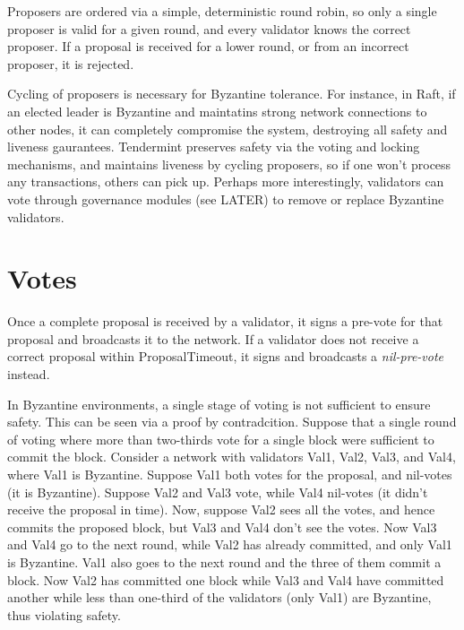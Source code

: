 Proposers are ordered via a simple, deterministic round robin, 
so only a single proposer is valid for a given round, 
and every validator knows the correct proposer. 
If a proposal is received for a lower round, or from an incorrect proposer, it is rejected.

Cycling of proposers is necessary for Byzantine tolerance. 
For instance, in Raft, if an elected leader is Byzantine and maintatins strong network connections to other nodes,
it can completely compromise the system, destroying all safety and liveness gaurantees.
Tendermint preserves safety via the voting and locking mechanisms, 
and maintains liveness by cycling proposers, so if one won't process any transactions, others can pick up.
Perhaps more interestingly, validators can vote through governance modules (see LATER) to remove or replace Byzantine validators.

\iffalse
TODO: move the tuning comment 
Upon entering a new round, validators wait ProposalTimeout to receive a complete proposal before broadcasting their pre-vote.
The ProposalTimeout thus serves as a critical paramter for tuning the performance of the system,
as it determines how much latency is permitted from proposers before validators start voting to skip them.
\fi

\section{Votes}

Once a complete proposal is received by a validator, 
it signs a pre-vote for that proposal and broadcasts it to the network.
If a validator does not receive a correct proposal within ProposalTimeout, 
it signs and broadcasts a \emph{nil-pre-vote} instead.

In Byzantine environments, a single stage of voting is not sufficient to ensure safety.
This can be seen via a proof by contradcition.
Suppose that a single round of voting where more than two-thirds vote for a single block were sufficient to commit the block.
Consider a network with validators Val1, Val2, Val3, and Val4, where Val1 is Byzantine.
Suppose Val1 both votes for the proposal, and nil-votes (it is Byzantine).
Suppose Val2 and Val3 vote, while Val4 nil-votes (it didn't receive the proposal in time).
Now, suppose Val2 sees all the votes, and hence commits the proposed block,
but Val3 and Val4 don't see the votes.
Now Val3 and Val4 go to the next round, while Val2 has already committed, and only Val1 is Byzantine.
Val1 also goes to the next round and the three of them commit a block.
Now Val2 has committed one block while Val3 and Val4 have committed another while less than one-third of the validators (only Val1) are Byzantine,
thus violating safety. 

